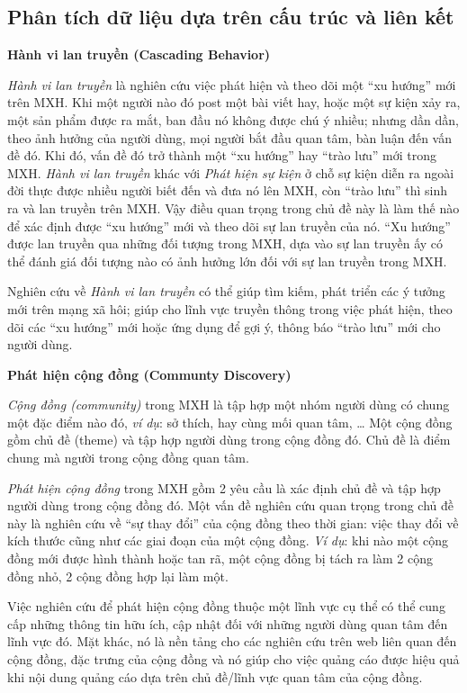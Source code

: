 \documentclass[12pt]{extarticle}
\begin{document}
			\subsection {Phân tích dữ liệu dựa trên cấu trúc và liên kết}
			\par \textbf{Hành vi lan truyền (Cascading Behavior)}
			\par \textit{Hành vi lan truyền} là nghiên cứu việc phát hiện và theo dõi một “xu hướng” mới trên MXH. Khi một người nào đó post một bài viết hay, hoặc một sự kiện xảy ra, một sản phẩm được ra mắt, ban đầu nó không được chú ý nhiều; nhưng dần dần, theo ảnh hưởng của người dùng, mọi người bắt đầu quan tâm, bàn luận đến vấn đề đó. Khi đó, vấn đề đó trở thành một “xu hướng” hay “trào lưu” mới trong MXH. \textit{Hành vi lan truyền} khác với \textit{Phát hiện sự kiện} ở chỗ sự kiện diễn ra ngoài đời thực được nhiều người biết đến và đưa nó lên MXH, còn “trào lưu” thì sinh ra và lan truyền trên MXH. Vậy điều quan trọng trong chủ đề này là làm thế nào để xác định được “xu hướng” mới và theo dõi sự lan truyền của nó. “Xu hướng” được lan truyền qua những đối tượng trong MXH, dựa vào sự lan truyền ấy có thể đánh giá đối tượng nào có ảnh hưởng lớn đối với sự lan truyền trong MXH.
			\par Nghiên cứu về \textit{Hành vi lan truyền} có thể giúp tìm kiếm, phát triển các ý tưởng mới trên mạng xã hôi; giúp cho lĩnh vực truyền thông trong việc phát hiện, theo dõi các “xu hướng” mới hoặc ứng dụng để gợi ý, thông báo “trào lưu” mới cho người dùng.
			\par \textbf{Phát hiện cộng đồng (Communty Discovery)}
			\par \textit{Cộng đồng (community)} trong MXH là tập hợp một nhóm người dùng có chung một đặc điểm nào đó, \textit{ví dụ}: sở thích, hay cùng mối quan tâm, …  Một cộng đồng gồm chủ đề (theme) và tập hợp người dùng trong cộng đồng đó. Chủ đề là điểm chung mà người trong cộng đồng quan tâm.
			\par \textit{Phát hiện cộng đồng} trong MXH gồm 2 yêu cầu là xác định chủ đề và tập hợp người dùng trong cộng đồng đó. Một vấn đề nghiên cứu quan trọng trong chủ đề này là nghiên cứu về “sự thay đổi” của cộng đồng theo thời gian: việc thay đổi về kích thước cũng như các giai đoạn của một cộng đồng. \textit{Ví dụ}: khi nào một cộng đồng mới được hình thành hoặc tan rã, một cộng đồng bị tách ra làm 2 cộng đồng nhỏ, 2 cộng đồng hợp lại làm một. 
			\par Việc nghiên cứu để phát hiện cộng đồng thuộc một lĩnh vực cụ thể có thể cung cấp những thông tin hữu ích, cập nhật đối với những người dùng quan tâm đến lĩnh vực đó. Mặt khác, nó là nền tảng cho các nghiên cứu trên web liên quan đến cộng đồng, đặc trưng của cộng đồng và nó giúp cho việc quảng cáo được hiệu quả khi nội dung quảng cáo dựa trên chủ đề/lĩnh vực quan tâm của cộng đồng.
\end{document}
